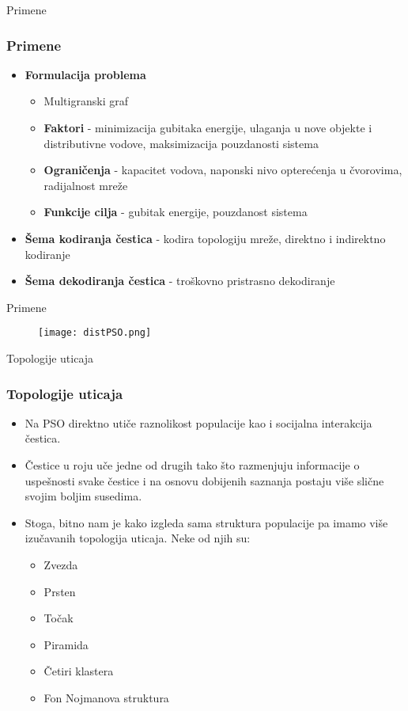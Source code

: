 \documentclass{beamer}
\begin{document}
\begin{frame}{Primene}

\frametitle{Primene}
\begin{itemize}
\item \textbf{Formulacija problema} 
\begin{itemize}
    \item Multigranski graf
    \item \textbf{Faktori} - minimizacija gubitaka energije, ulaganja u nove objekte i distributivne vodove, maksimizacija pouzdanosti sistema
    \item \textbf{Ograničenja} - kapacitet vodova, naponski nivo opterećenja u čvorovima, radijalnost mreže
    \item \textbf{Funkcije cilja} - gubitak energije, pouzdanost sistema
\end{itemize}
\item \textbf{Šema kodiranja čestica} - kodira topologiju mreže, direktno i indirektno kodiranje
\item \textbf{Šema dekodiranja čestica} - troškovno pristrasno dekodiranje

\end{itemize}


\end{frame}


\begin{frame}{Primene}
\begin{figure}
\texttt{[image: distPSO.png]}
\end{figure}

\end{frame}


\begin{frame}{Topologije uticaja}
\frametitle{Topologije uticaja }
\begin{itemize}
    \item Na PSO direktno utiče raznolikost populacije kao i socijalna interakcija čestica.
    \item Čestice u roju uče jedne od drugih tako što razmenjuju informacije o uspešnosti svake čestice i na osnovu dobijenih saznanja postaju više slične svojim boljim susedima. 
    \item Stoga, bitno nam je kako izgleda sama struktura populacije pa imamo više izučavanih topologija uticaja. Neke od njih su:
    \begin{itemize}
        \item Zvezda
        \item Prsten
        \item Točak
        \item Piramida
        \item Četiri klastera
        \item Fon Nojmanova struktura
    \end{itemize}

\end{itemize}
\end{frame}
\end{document}
